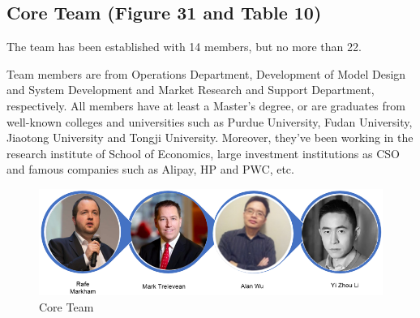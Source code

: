 \documentclass[fleqn,10pt]{SelfArx} %
\begin{document}
\subsection{Core Team (Figure 31 and Table 10)}
The team has been established with 14 members, but no more than 22. 

Team members are from Operations Department, Development of Model Design and System Development and Market Research and Support Department, respectively. All members have at least a Master’s degree, or are graduates from well-known colleges and universities such as Purdue University, Fudan University, Jiaotong University and Tongji University. Moreover, they've been working in the research institute of School of Economics, large investment institutions as CSO and famous companies such as Alipay, HP and PWC, etc.\\

\begin{figure}[!hbt]\centering %
\includegraphics[width=\linewidth]{32}
\caption{Core Team}
\label{fig:32}
\end{figure}
\end{document}
